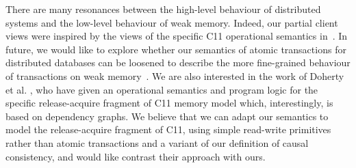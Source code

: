 There are many resonances between the high-level  behaviour
of distributed systems and the low-level behaviour  of weak
memory. Indeed, our partial client views were 
inspired by the views of  the specific C11 operational semantics
in~\cite{promises}. In future, we would like to explore whether our semantics 
of atomic transactions for distributed databases can be loosened to
describe the more fine-grained behaviour of transactions on weak
memory~\cite{giverelevantcitations}. We are also interested in the
work of 
Doherty et al. \citet{op-semantics-c11-rar}, who have given  an
operational semantics and program logic
for the specific release-acquire fragment of C11 memory model which, interestingly, 
is based on dependency graphs. We believe that we can adapt our
semantics to 
model the release-acquire fragment of C11, using simple read-write
primitives rather than atomic transactions and 
 a variant of our definition of causal consistency, and would like 
contrast their approach with ours. 
